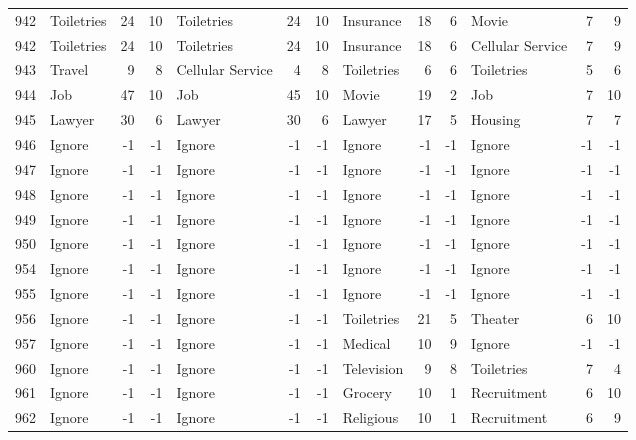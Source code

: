 \begin{figure}[htbp]
\begin{tabular}{rlrrlrrlrrlrr}
    942   & Toiletries & 24    & 10    & Toiletries & 24    & 10    & Insurance & 18    & 6     & Movie & 7     & 9 \\
    942   & Toiletries & 24    & 10    & Toiletries & 24    & 10    & Insurance & 18    & 6     & Cellular Service & 7     & 9 \\
    943   & Travel & 9     & 8     & Cellular Service & 4     & 8     & Toiletries & 6     & 6     & Toiletries & 5     & 6 \\
    944   & Job   & 47    & 10    & Job   & 45    & 10    & Movie & 19    & 2     & Job   & 7     & 10 \\
    945   & Lawyer & 30    & 6     & Lawyer & 30    & 6     & Lawyer & 17    & 5     & Housing & 7     & 7 \\
    946   & Ignore & -1    & -1    & Ignore & -1    & -1    & Ignore & -1    & -1    & Ignore & -1    & -1 \\
    947   & Ignore & -1    & -1    & Ignore & -1    & -1    & Ignore & -1    & -1    & Ignore & -1    & -1 \\
    948   & Ignore & -1    & -1    & Ignore & -1    & -1    & Ignore & -1    & -1    & Ignore & -1    & -1 \\
    949   & Ignore & -1    & -1    & Ignore & -1    & -1    & Ignore & -1    & -1    & Ignore & -1    & -1 \\
    950   & Ignore & -1    & -1    & Ignore & -1    & -1    & Ignore & -1    & -1    & Ignore & -1    & -1 \\
    954   & Ignore & -1    & -1    & Ignore & -1    & -1    & Ignore & -1    & -1    & Ignore & -1    & -1 \\
    955   & Ignore & -1    & -1    & Ignore & -1    & -1    & Ignore & -1    & -1    & Ignore & -1    & -1 \\
    956   & Ignore & -1    & -1    & Ignore & -1    & -1    & Toiletries & 21    & 5     & Theater & 6     & 10 \\
    957   & Ignore & -1    & -1    & Ignore & -1    & -1    & Medical & 10    & 9     & Ignore & -1    & -1 \\
    960   & Ignore & -1    & -1    & Ignore & -1    & -1    & Television & 9     & 8     & Toiletries & 7     & 4 \\
    961   & Ignore & -1    & -1    & Ignore & -1    & -1    & Grocery & 10    & 1     & Recruitment & 6     & 10 \\
    962   & Ignore & -1    & -1    & Ignore & -1    & -1    & Religious & 10    & 1     & Recruitment & 6     & 9 \\

\end{tabular}
\end{figure}
